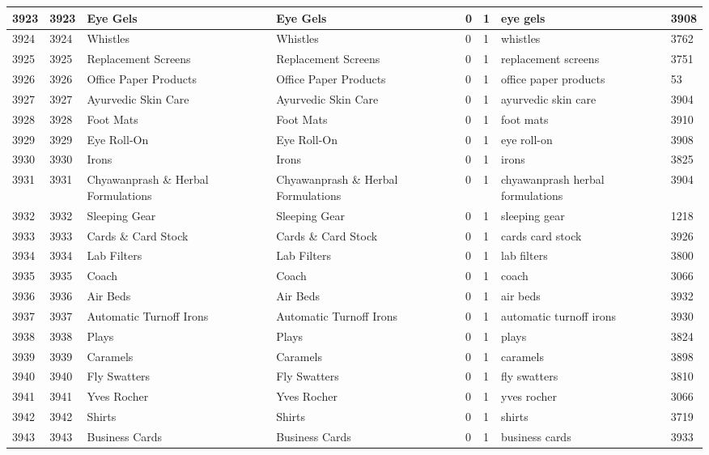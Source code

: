 \begin{longtable}{|l|l|l|l|l|l|l|l|}
3923 & 3923 & Eye Gels & Eye Gels & 0 & 1 & eye gels & 3908 \\ \hline 
3924 & 3924 & Whistles & Whistles & 0 & 1 & whistles & 3762 \\ \hline 
3925 & 3925 & Replacement Screens & Replacement Screens & 0 & 1 & replacement screens & 3751 \\ \hline 
3926 & 3926 & Office Paper Products & Office Paper Products & 0 & 1 & office paper products & 53 \\ \hline 
3927 & 3927 & Ayurvedic Skin Care & Ayurvedic Skin Care & 0 & 1 & ayurvedic skin care & 3904 \\ \hline 
3928 & 3928 & Foot Mats & Foot Mats & 0 & 1 & foot mats & 3910 \\ \hline 
3929 & 3929 & Eye Roll-On & Eye Roll-On & 0 & 1 & eye roll-on & 3908 \\ \hline 
3930 & 3930 & Irons & Irons & 0 & 1 & irons & 3825 \\ \hline 
3931 & 3931 & Chyawanprash \& Herbal Formulations & Chyawanprash \& Herbal Formulations & 0 & 1 & chyawanprash herbal formulations & 3904 \\ \hline 
3932 & 3932 & Sleeping Gear & Sleeping Gear & 0 & 1 & sleeping gear & 1218 \\ \hline 
3933 & 3933 & Cards \& Card Stock & Cards \& Card Stock & 0 & 1 & cards card stock & 3926 \\ \hline 
3934 & 3934 & Lab Filters & Lab Filters & 0 & 1 & lab filters & 3800 \\ \hline 
3935 & 3935 & Coach & Coach & 0 & 1 & coach & 3066 \\ \hline 
3936 & 3936 & Air Beds & Air Beds & 0 & 1 & air beds & 3932 \\ \hline 
3937 & 3937 & Automatic Turnoff Irons & Automatic Turnoff Irons & 0 & 1 & automatic turnoff irons & 3930 \\ \hline 
3938 & 3938 & Plays & Plays & 0 & 1 & plays & 3824 \\ \hline 
3939 & 3939 & Caramels & Caramels & 0 & 1 & caramels & 3898 \\ \hline 
3940 & 3940 & Fly Swatters & Fly Swatters & 0 & 1 & fly swatters & 3810 \\ \hline 
3941 & 3941 & Yves Rocher & Yves Rocher & 0 & 1 & yves rocher & 3066 \\ \hline 
3942 & 3942 & Shirts & Shirts & 0 & 1 & shirts & 3719 \\ \hline 
3943 & 3943 & Business Cards & Business Cards & 0 & 1 & business cards & 3933 \\ \hline 

\end{longtable}
